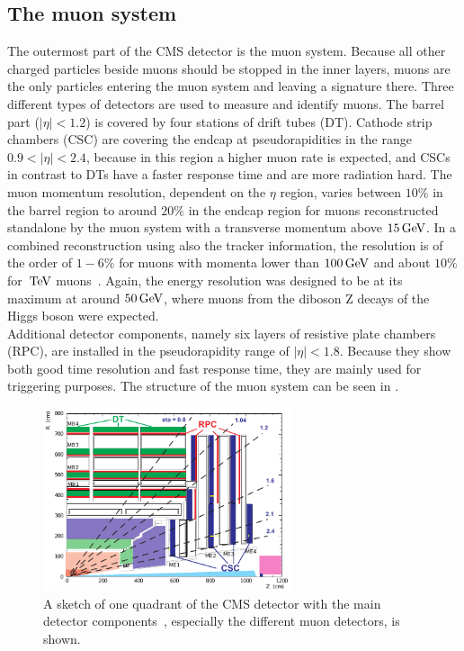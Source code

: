 \subsection{The muon system}
The outermost part of the CMS detector is the muon system. Because all other charged particles beside muons should be stopped in the inner layers, muons are the only particles entering the muon system and leaving a signature there. Three different types of detectors are used to measure and identify muons. The barrel part ($|\eta|<1.2$) is covered by four stations of drift tubes (DT). Cathode strip chambers (CSC) are covering the endcap at pseudorapidities in the range $0.9<|\eta|<2.4$, because in this region a higher muon rate is expected, and CSCs in contrast to DTs have a faster response time and are more radiation hard.
The muon momentum resolution, dependent on the $\eta$ region, varies between $10\%$ in the barrel region to around $20\%$ in the endcap region for muons reconstructed standalone by the muon system with a transverse momentum above $15\,\text{Ge\hspace{-.08em}V}$.
In a combined reconstruction using also the tracker information, the resolution is of the order of $1-6\%$ for muons with momenta lower than $100\,\text{Ge\hspace{-.08em}V}$ and about $10\%$ for $\,\text{Te\hspace{-.08em}V}$ muons~\cite{MuonPerformance}.
Again, the energy resolution was designed to be at its maximum at around $50\,\text{Ge\hspace{-.08em}V}$, where muons from the diboson Z decays of the Higgs boson were expected.\\
Additional detector components, namely six layers of resistive plate chambers (RPC), are installed in the pseudorapidity range of $|\eta|<1.8$. Because they show both good time resolution and fast response time, they are mainly used for triggering purposes. The structure of the muon system can be seen in .
\begin{figure}[tbp]
 \centering
 \includegraphics[width=0.65\textwidth]{figures/general/muonChamber}
 \caption{A sketch of one quadrant of the CMS detector with the main detector components~\cite{CMSTDR}, especially the different muon detectors, is shown.}
 \label{fig:etaPlaneCMSTotal}
\end{figure}
